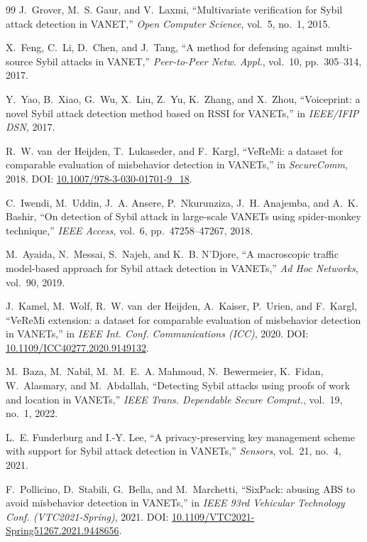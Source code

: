 \documentclass[journal,twoside]{IEEEtran}
\begin{document}
\begin{thebibliography}{99}
 J.~Grover, M.~S. Gaur, and V.~Laxmi, ``Multivariate verification for Sybil attack detection in VANET,'' \emph{Open Computer Science}, vol.~5, no.~1, 2015.

 X.~Feng, C.~Li, D.~Chen, and J.~Tang, ``A method for defensing against multi-source Sybil attacks in VANET,'' \emph{Peer-to-Peer Netw. Appl.}, vol.~10, pp.~305--314, 2017.

 Y.~Yao, B.~Xiao, G.~Wu, X.~Liu, Z.~Yu, K.~Zhang, and X.~Zhou, ``Voiceprint: a novel Sybil attack detection method based on RSSI for VANETs,'' in \emph{IEEE/IFIP DSN}, 2017.

 R.~W. van~der Heijden, T.~Lukaseder, and F.~Kargl, ``VeReMi: a dataset for comparable evaluation of misbehavior detection in VANETs,'' in \emph{SecureComm}, 2018. DOI: \url{10.1007/978-3-030-01701-9\_18}.

 C.~Iwendi, M.~Uddin, J.~A. Ansere, P.~Nkurunziza, J.~H. Anajemba, and A.~K. Bashir, ``On detection of Sybil attack in large-scale VANETs using spider-monkey technique,'' \emph{IEEE Access}, vol.~6, pp.~47258--47267, 2018.

 M.~Ayaida, N.~Messai, S.~Najeh, and K.~B. N'Djore, ``A macroscopic traffic model-based approach for Sybil attack detection in VANETs,'' \emph{Ad Hoc Networks}, vol.~90, 2019.

 J.~Kamel, M.~Wolf, R.~W. van~der Heijden, A.~Kaiser, P.~Urien, and F.~Kargl, ``VeReMi extension: a dataset for comparable evaluation of misbehavior detection in VANETs,'' in \emph{IEEE Int. Conf. Communications (ICC)}, 2020. DOI: \url{10.1109/ICC40277.2020.9149132}.

 M.~Baza, M.~Nabil, M.~M.~E.~A. Mahmoud, N.~Bewermeier, K.~Fidan, W.~Alasmary, and M.~Abdallah, ``Detecting Sybil attacks using proofs of work and location in VANETs,'' \emph{IEEE Trans. Dependable Secure Comput.}, vol.~19, no.~1, 2022.

 L.~E. Funderburg and I.-Y. Lee, ``A privacy-preserving key management scheme with support for Sybil attack detection in VANETs,'' \emph{Sensors}, vol.~21, no.~4, 2021.

 F.~Pollicino, D.~Stabili, G.~Bella, and M.~Marchetti, ``SixPack: abusing ABS to avoid misbehavior detection in VANETs,'' in \emph{IEEE 93rd Vehicular Technology Conf. (VTC2021-Spring)}, 2021. DOI: \url{10.1109/VTC2021-Spring51267.2021.9448656}.


\end{thebibliography}
\end{document}
